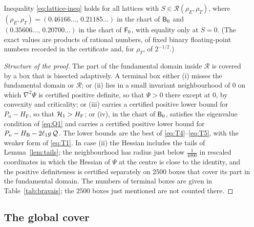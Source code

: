 \begin{proposition}\label{prop:strainregions}
Inequality \eqref{eq:lattice-ineq} holds for all lattices with $S\in\mathcal R(\rho_E,\rho_T)$, where
$(\rho_E,\rho_T)=(0.46166\ldots,\,0.21185\ldots)$ in the chart of $\mathsf B_0$ and $(0.35606\ldots,\,0.20700\ldots)$ in the chart of $\mathsf F_0$,
with equality only at $S=0$. (The exact values are products of rational numbers, of fixed binary floating-point numbers recorded
in the certificate and, for $\rho_T$, of $2^{-1/2}$.)
\end{proposition}

\begin{proof}[Structure of the proof]
The part of the fundamental domain inside $\mathcal R$ is covered by a box that is bisected adaptively. A terminal box either
\textup{(i)} misses the fundamental domain or $\mathcal R$; or \textup{(ii)} lies in a small invariant neighbourhood of $0$ on which
$\nabla^2\Psi$ is certified positive definite, so that $\Psi>0$ there except at $0$, by convexity and criticality; or \textup{(iii)}
carries a certified positive lower bound for $P_n-H_\mathrm F$, so that $\mathcal H_1>H_\mathrm F$; or \textup{(iv)}, in the chart of $\mathsf B_0$,
satisfies the eigenvalue condition of \eqref{eq:Q1} and carries a certified positive lower bound for
$P_n-H_\mathrm B-2\ell_1g\,\mathcal Q$. The lower bounds are the best of \eqref{eq:T4}--\eqref{eq:T5}, with the weaker form of
\eqref{eq:T1}. In case \textup{(ii)} the Hessian includes the tails of Lemma~\ref{lem:tails}; the neighbourhood has radius just
below $\frac1{4000}$ in rescaled coordinates in which the Hessian of $\Psi$ at the centre is close to the identity, and the
positive definiteness is certified separately on $2500$ boxes that cover its part in the fundamental domain. The numbers of
terminal boxes are given in Table~\ref{tab:bravais}; the $2500$ boxes just mentioned are not counted there.
\end{proof}

\subsection{The global cover}

